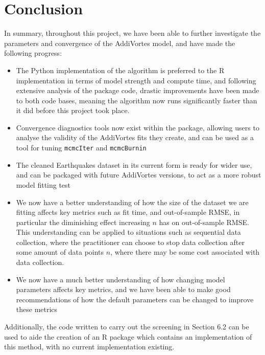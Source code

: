 \documentclass[10pt]{article}
\begin{document}
\section{Conclusion}
In summary, throughout this project, we have been able to further investigate the parameters and convergence of the AddiVortes model, and have made the following progress:
\begin{itemize}
\item The Python implementation of the algorithm is preferred to the R implementation in terms of model strength and compute time, and following extensive analysis of the package code, drastic improvements have been made to both code bases, meaning the algorithm now runs significantly faster than it did before this project took place.
\item Convergence diagnostics tools now exist within the package, allowing users to analyse the validity of the AddiVortes fits they create, and can be used as a tool for tuning \texttt{mcmcIter} and \texttt{mcmcBurnin}
\item The cleaned Earthquakes dataset in its current form is ready for wider use, and can be packaged with future AddiVortes versions, to act as a more robust model fitting test
\item We now have a better understanding of how the size of the dataset we are fitting affects key metrics such as fit time, and out-of-sample RMSE, in particular the diminishing effect increasing $n$ has on out-of-sample RMSE. This understanding can be applied to situations such as sequential data collection, where the practitioner can choose to stop data collection after some amount of data points $n$, where there may be some cost associated with data collection.
\item We now have a much better understanding of how changing model parameters affects key metrics, and we have been able to make good recommendations of how the default parameters can be changed to improve these metrics\\
\end{itemize}
Additionally, the code written to carry out the screening in Section 6.2 can be used to aide the creation of an R package which contains an implementation of this method, with no current implementation existing.

\clearpage
\appendix
\end{document}

